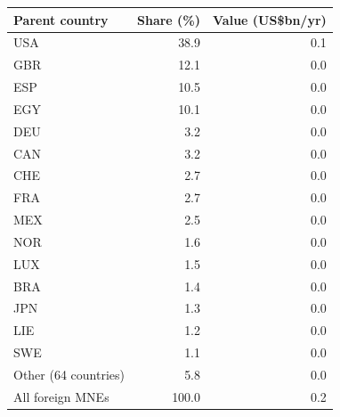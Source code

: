 \begin{tabular}{lrr}
\toprule
Parent country & Share (\%) & Value (US\$bn/yr) \\
\midrule
USA & 38.9 & 0.1 \\
GBR & 12.1 & 0.0 \\
ESP & 10.5 & 0.0 \\
EGY & 10.1 & 0.0 \\
DEU & 3.2 & 0.0 \\
CAN & 3.2 & 0.0 \\
CHE & 2.7 & 0.0 \\
FRA & 2.7 & 0.0 \\
MEX & 2.5 & 0.0 \\
NOR & 1.6 & 0.0 \\
LUX & 1.5 & 0.0 \\
BRA & 1.4 & 0.0 \\
JPN & 1.3 & 0.0 \\
LIE & 1.2 & 0.0 \\
SWE & 1.1 & 0.0 \\
Other (64 countries) & 5.8 & 0.0 \\
\midrule
All foreign MNEs & 100.0 & 0.2 \\
\bottomrule
\end{tabular}
